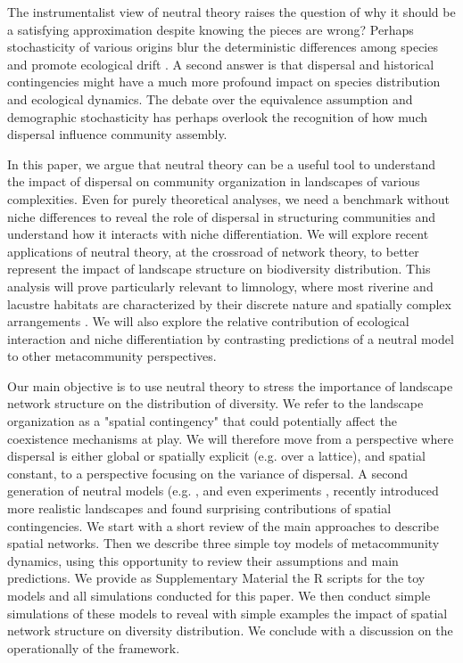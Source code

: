 \documentclass[12pt]{article}
\begin{document}
The instrumentalist view of neutral theory raises the question of why it should
be a satisfying approximation despite knowing the pieces are wrong? Perhaps stochasticity
of various origins blur the deterministic differences among species and
promote ecological drift \parencite{Gravel2011}. A second answer is that dispersal and historical contingencies might
have a much more profound impact on species distribution \parencite{Bahn2007,
Boulangeat2012} and ecological dynamics. The debate over the equivalence
assumption and demographic stochasticity has perhaps overlook the recognition of
how much dispersal influence community assembly.

In this paper, we argue that neutral
theory can be a useful tool to understand the impact of dispersal on community
organization in landscapes of various complexities. Even for purely
theoretical analyses, we need a benchmark without niche differences to reveal
the role of dispersal in structuring communities and understand how it
interacts with niche differentiation. We will explore recent applications of
neutral theory, at the crossroad of network theory, to better represent the
impact of landscape structure on biodiversity distribution. This analysis will
prove particularly relevant to limnology, where most riverine and lacustre
habitats are characterized by their discrete nature and spatially complex
arrangements \parencite{Peterson2013}. We will also explore the relative
contribution of ecological interaction and niche differentiation by contrasting
predictions of a neutral model to other metacommunity perspectives. 

Our main objective is to use neutral theory to stress the
importance of landscape network structure on the distribution of diversity. We
refer to the landscape organization as a "spatial contingency"
\parencite{Peres-Neto2013} that could potentially affect the coexistence
mechanisms at play. We will therefore move from a perspective where dispersal is
either global or spatially explicit (e.g. over a lattice), and spatial
constant, to a perspective focusing on the variance of dispersal. A second
generation of neutral models (e.g. \textcite{Economo2008,
Economo2011,Desjardins2012a,Desjardins2012b}, and even experiments
\parencite{Altermat2012}, recently introduced more realistic landscapes and found
surprising contributions of spatial contingencies. We start with a short
review of the main approaches to describe spatial networks. Then we describe three simple toy models of
metacommunity dynamics, using this opportunity to review their assumptions and
main predictions. We provide as Supplementary Material the R scripts for the toy
models and all simulations conducted for this paper. We then conduct simple
simulations of these models to reveal with simple examples the impact of spatial
network structure on diversity distribution. We conclude with a discussion on
the operationally of the framework.
\end{document}
